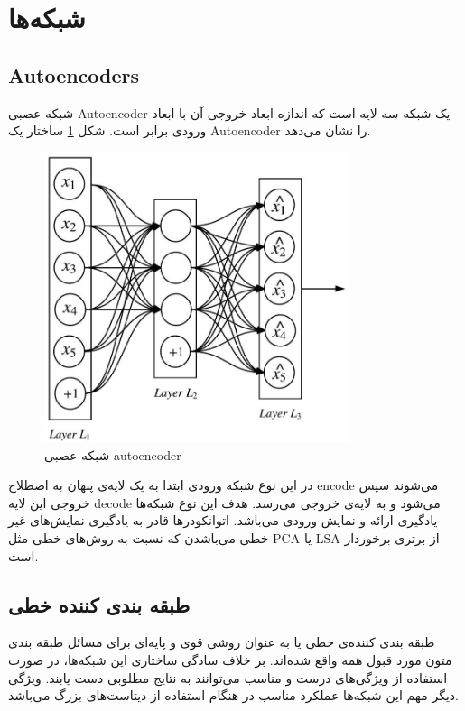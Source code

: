 \documentclass[12pt, a4paper, oneside]{report}
\begin{document}
\section{شبکه‌ها}

\subsection{Autoencoders}

شبکه عصبی
Autoencoder
یک شبکه سه لایه است که اندازه ابعاد خروجی آن با ابعاد ورودی برابر است. شکل 
\ref{fig:autoencoder}
ساختار یک
Autoencoder
را نشان می‌دهد.

\begin{figure}[h]
    \centering
    \includegraphics[width=0.80\textwidth]{autoencoder}
    \caption{شبکه عصبی autoencoder}
    \label{fig:autoencoder}
\end{figure}

در این نوع شبکه ورودی ابتدا به یک لایه‌ی پنهان به اصطلاح
encode
می‌شوند سپس خروجی این لایه 
decode
می‌شود و به لایه‌ی خروجی می‌رسد. هدف این نوع شبکه‌ها یادگیری ارائه‌ و نمایش ورودی می‌باشد. اتوانکودرها قادر به یادگیری
نمایش‌های غیر خطی می‌باشدن که نسبت به روش‌های خطی مثل
PCA
یا
LSA
از برتری برخوردار است.

\subsection{طبقه بندی کننده خطی}

طبقه بندی کننده‌ی خطی یا
به عنوان روشی قوی و پایه‌ای برای مسائل طبقه بندی متون مورد قبول همه واقع شده‌اند. بر خلاف
سادگی ساختاری این شبکه‌ها، در صورت استفاده از ویژگی‌های درست و مناسب می‌توانند به نتایج مطلوبی
دست‌ یابند. ویژگی دیگر مهم این شبکه‌ها عملکرد مناسب در هنگام استفاده از دیتاست‌های بزرگ می‌باشد\cite{joulin2016fasttext}.
\end{document}
